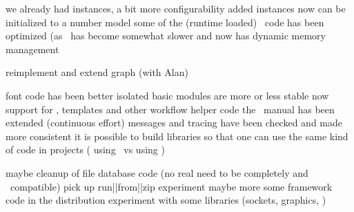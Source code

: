 \stoptopic

\StopSteps

\StartSteps

\starttopic[title={MetaPost\\recently done}]

    \startitemize
        \startitem we already had instances, a bit more configurability added \FlushStep \stopitem
        \startitem instances now can be initialized to a number model \FlushStep \stopitem
        \startitem some of the (runtime loaded) \METAFUN\ code has been optimized (as \METAPOST\ has become somewhat slower and now has dynamic memory management \FlushStep \stopitem
    \stopitemize

\stoptopic

\StopSteps

\StartSteps

\starttopic[title={MetaPost\\next on the todo list}]

    \startitemize
        \startitem reimplement and extend graph (with Alan) \FlushStep \stopitem
    \stopitemize

\stoptopic

\StopSteps

\StartSteps

\starttopic[title={Lua\\recently done}]

    \startitemize
        \startitem font code has been better isolated \FlushStep \stopitem
        \startitem basic modules are more or less stable now \FlushStep \stopitem
        \startitem support for \SQL, templates and other workflow helper code \FlushStep \stopitem
        \startitem the \CLD\ manual has been extended (continuous effort) \FlushStep \stopitem
        \startitem messages and tracing have been checked and made more consistent \FlushStep \stopitem
        \startitem it is possible to build libraries so that one can use the same kind of code in projects ( using \LUATEX\ vs  using \LUA) \FlushStep \stopitem
    \stopitemize

\stoptopic

\StopSteps

\StartSteps

\starttopic[title={Lua\\next on the todo list}]

    \startitemize
        \startitem
            maybe cleanup of file database code (no real need to be completely  and \TDS\ compatible)
        \FlushStep \stopitem
        \startitem
            pick up run||from||zip experiment
        \FlushStep \stopitem
        \startitem
            maybe more some framework code in the distribution
        \FlushStep \stopitem
        \startitem
            experiment with some libraries (sockets, graphics, )
        \FlushStep \stopitem
    \stopitemize

